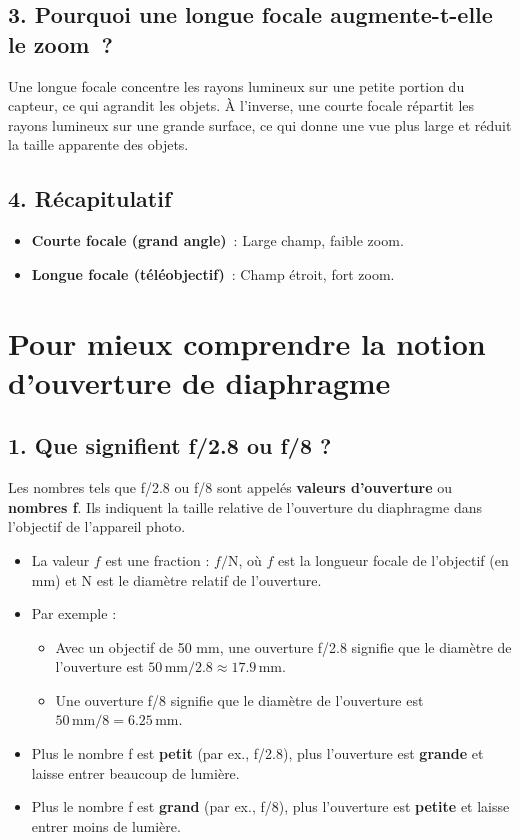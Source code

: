 \documentclass[answers]{exam}
\begin{document}
\subsection*{3. Pourquoi une longue focale augmente-t-elle le zoom ?}

Une longue focale concentre les rayons lumineux sur une petite portion du capteur, ce qui agrandit les objets. À l'inverse, une courte focale répartit les rayons lumineux sur une grande surface, ce qui donne une vue plus large et réduit la taille apparente des objets.

\subsection*{4. Récapitulatif}

\begin{itemize}[noitemsep]
    \item \textbf{Courte focale (grand angle)} : Large champ, faible zoom.
    \item \textbf{Longue focale (téléobjectif)} : Champ étroit, fort zoom.
\end{itemize}


\section*{Pour mieux comprendre la notion d'ouverture de diaphragme}


\subsection*{1. Que signifient f/2.8 ou f/8 ?}

Les nombres tels que f/2.8 ou f/8 sont appelés \textbf{valeurs d'ouverture} ou \textbf{nombres f}. Ils indiquent la taille relative de l'ouverture du diaphragme dans l'objectif de l'appareil photo.

\begin{itemize}[noitemsep]
    \item La valeur \( f \) est une fraction : \( f/\text{N} \), où \( f \) est la longueur focale de l'objectif (en mm) et \( \text{N} \) est le diamètre relatif de l'ouverture.
    \item Par exemple :
    \begin{itemize}[noitemsep]
        \item Avec un objectif de 50 mm, une ouverture f/2.8 signifie que le diamètre de l'ouverture est \( 50 \, \text{mm} / 2.8 \approx 17.9 \, \text{mm} \).
        \item Une ouverture f/8 signifie que le diamètre de l'ouverture est \( 50 \, \text{mm} / 8 = 6.25 \, \text{mm} \).
    \end{itemize}
    \item Plus le nombre f est \textbf{petit} (par ex., f/2.8), plus l'ouverture est \textbf{grande} et laisse entrer beaucoup de lumière.
    \item Plus le nombre f est \textbf{grand} (par ex., f/8), plus l'ouverture est \textbf{petite} et laisse entrer moins de lumière.
\end{itemize}
\end{document}

